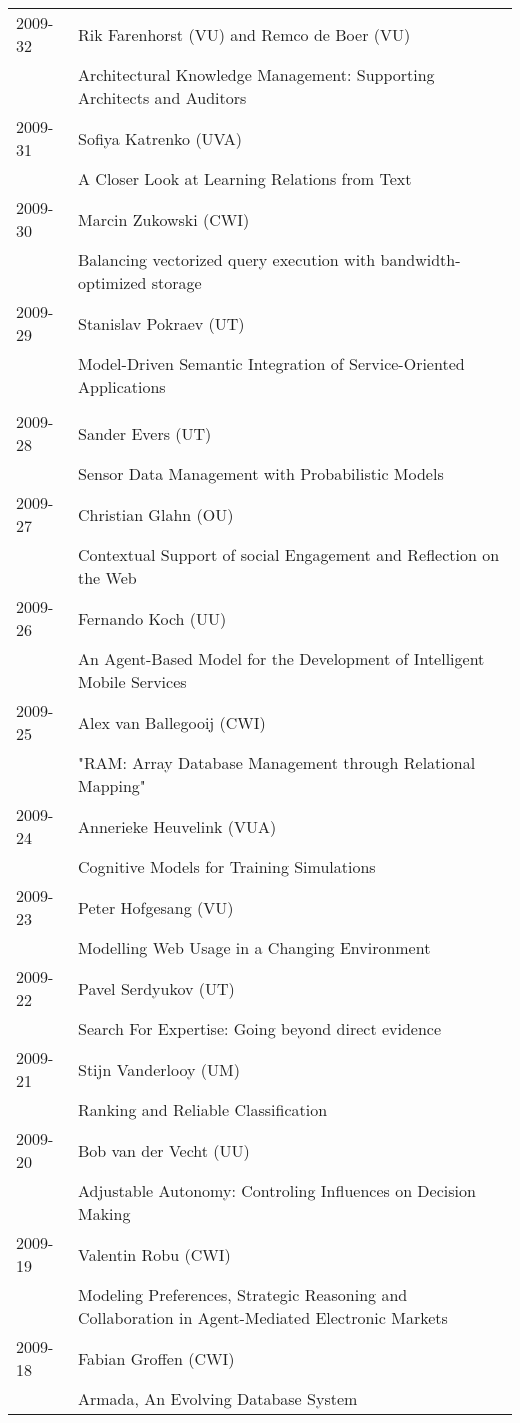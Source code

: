\begin{longtable}{p{1.25cm}p{10.75cm}}
2009-32 & Rik Farenhorst (VU) and Remco de Boer (VU) \\& Architectural Knowledge Management: Supporting Architects and Auditors \\
2009-31 & Sofiya Katrenko (UVA) \\& A Closer Look at Learning Relations from Text \\
2009-30 & Marcin Zukowski (CWI) \\& Balancing vectorized query execution with bandwidth-optimized storage \\
2009-29 & Stanislav Pokraev (UT) \\& Model-Driven Semantic Integration of Service-Oriented Applications \\
\\
2009-28 & Sander Evers (UT) \\& Sensor Data Management with Probabilistic Models \\
2009-27 & Christian Glahn (OU) \\& Contextual Support of social Engagement and Reflection on the Web \\
2009-26 & Fernando Koch (UU) \\& An Agent-Based Model for the Development of Intelligent Mobile Services \\
2009-25 & Alex van Ballegooij (CWI) \\& "RAM: Array Database Management through Relational Mapping" \\
2009-24 & Annerieke Heuvelink (VUA) \\& Cognitive Models for Training Simulations \\
2009-23 & Peter Hofgesang (VU) \\& Modelling Web Usage in a Changing Environment \\
2009-22 & Pavel Serdyukov (UT) \\& Search For Expertise: Going beyond direct evidence \\
2009-21 & Stijn Vanderlooy (UM) \\& Ranking and Reliable Classification \\
2009-20 & Bob van der Vecht (UU) \\& Adjustable Autonomy: Controling Influences on Decision Making \\
2009-19 & Valentin Robu (CWI) \\& Modeling Preferences, Strategic Reasoning and Collaboration in Agent-Mediated Electronic Markets \\
2009-18 & Fabian Groffen (CWI) \\& Armada, An Evolving Database System \\

\end{longtable}
